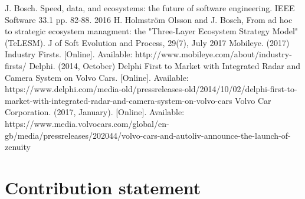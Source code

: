 \documentclass[conference]{IEEEtran}
\begin{document}
\begin{thebibliography}{00}
	 J. Bosch. Speed, data, and ecosystems: the future of software engineering. IEEE Software 33.1 pp. 82-88. 2016
	 H. Holmstr\"{o}m Olsson and J. Bosch, From ad hoc to strategic ecosystem managment: the "Three-Layer Ecosystem Strategy Model" (TeLESM). J of Soft Evolution and Process, 29(7), July 2017
	  Mobileye. (2017) Industry Firsts. [Online]. Available: http://www.mobileye.com/about/industry-firsts/
	 Delphi. (2014, October) Delphi First to Market with Integrated Radar and Camera System on Volvo Cars. [Online]. Available: https://www.delphi.com/media-old/pressreleases-old/2014/10/02/delphi-first-to-market-with-integrated-radar-and-camera-system-on-volvo-cars
	 Volvo Car Corporation. (2017, January). [Online]. Available: https://www.media.volvocars.com/global/en-gb/media/pressreleases/202044/volvo-cars-and-autoliv-announce-the-launch-of-zenuity
	
\end{thebibliography}

\pagebreak
\appendix
\section*{Contribution statement}
\end{document}

